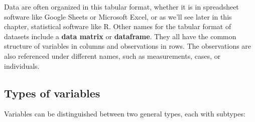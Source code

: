 \documentclass[
]{book}
\begin{document}
Data are often organized in this tabular format, whether it is in spreadsheet software like Google Sheets or Microsoft Excel, or as we'll see later in this chapter, statistical software like R. Other names for the tabular format of datasets include a \textbf{data matrix} or \textbf{dataframe}. They all have the common structure of variables in columns and observations in rows. The observations are also referenced under different names, such as measurements, cases, or individuals.

\subsection{Types of variables}\label{types-of-variables}

Variables can be distinguished between two general types, each with subtypes:
\end{document}
